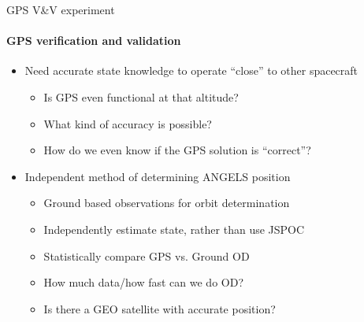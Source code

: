\begin{frame}[t]{GPS V\&V experiment}
    \framesubtitle{GPS verification and validation}
    \begin{itemize}
        \item<1-> Need accurate state knowledge to operate ``close'' to other spacecraft
        \begin{itemize}
            \item Is GPS even functional at that altitude?
            \item What kind of accuracy is possible?
            \item How do we even know if the GPS solution is ``correct''?
        \end{itemize}
        \item<2-> Independent method of determining ANGELS position
        \begin{itemize}
            \item Ground based observations for orbit determination
            \item Independently estimate state, rather than use JSPOC
            \item Statistically compare GPS vs. Ground OD 
            \item How much data/how fast can we do OD?
            \item Is there a GEO satellite with accurate position?
        \end{itemize}
    \end{itemize}
\end{frame}

